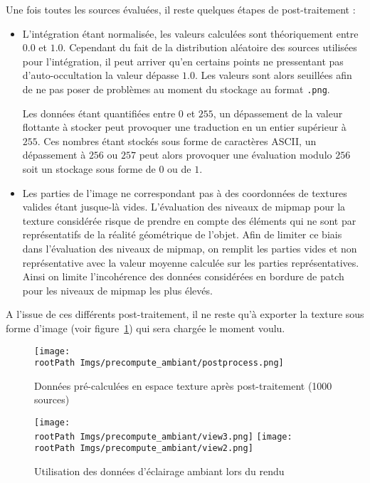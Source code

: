 \documentclass[10pt,a4paper,twoside, twocolumn]{report}
\newcommand*{\rootPath}{../}
\begin{document}
Une fois toutes les sources évaluées, il reste quelques étapes de post-traitement :
\begin{itemize}
	\item L'intégration étant normalisée, les valeurs calculées sont théoriquement entre $0.0$ et $1.0$. Cependant du fait de la distribution aléatoire des sources utilisées pour l'intégration, il peut arriver qu'en certains points ne pressentant pas d'auto-occultation la valeur dépasse $1.0$. Les valeurs sont alors seuillées afin de ne pas poser de problèmes au moment du stockage au format \texttt{.png}.

	Les données étant quantifiées entre $0$ et $255$, un dépassement de la valeur flottante à stocker peut provoquer une traduction en un entier supérieur à $255$. Ces nombres étant stockés sous forme de caractères ASCII, un dépassement à $256$ ou $257$ peut alors provoquer une évaluation modulo $256$ soit un stockage sous forme de $0$ ou de $1$.

	\item Les parties de l'image ne correspondant pas à des coordonnées de textures valides étant jusque-là vides. L'évaluation des niveaux de mipmap pour la texture considérée risque de prendre en compte des éléments qui ne sont par représentatifs de la réalité géométrique de l'objet. Afin de limiter ce biais dans l'évaluation des niveaux de mipmap, on remplit les parties vides et non représentative avec la valeur moyenne calculée sur les parties représentatives. Ainsi on limite l’incohérence des données considérées en bordure de patch pour les niveaux de mipmap les plus élevés.
\end{itemize}

A l'issue de ces différents post-traitement, il ne reste qu'à exporter la texture sous forme d'image (voir figure~\ref{fig:precompute_ambiant:postprocess}) qui sera chargée le moment voulu.

\begin{figure}[!ht]\centering
	\texttt{[image: \\rootPath Imgs/precompute\_ambiant/postprocess.png]}
	\caption{Données pré-calculées en espace texture après post-traitement (1000 sources)}
	\label{fig:precompute_ambiant:postprocess}
\end{figure}

\begin{figure}[!ht]\centering
	\texttt{[image: \\rootPath Imgs/precompute\_ambiant/view3.png]}
	\hspace{0.5cm}
	\texttt{[image: \\rootPath Imgs/precompute\_ambiant/view2.png]}
	\caption{Utilisation des données d'éclairage ambiant lors du rendu}
	\label{fig:precompute_ambiant:view}
\end{figure}
\end{document}
